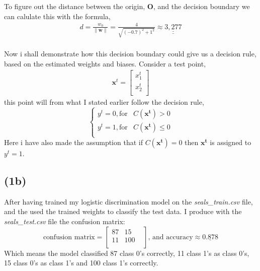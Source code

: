 \documentclass[12pt, letterpaper]{article}
\newcommand{\bs}{\boldsymbol}
\newcommand{\mbf}{\mathbf}
\begin{document}
      \newline
      To figure out the distance between the origin, $\bs{O}$, and the decision boundary we can calulate this with the formula,
      \begin{align*}
        d = \frac{w_0}{\|\bs{w}\|} = \frac{4}{\sqrt{(-0.7)^2 + 1^2}} \approx \underline{\underline{3,277}}
      \end{align*}\\
      Now i shall demonstrate how this decision boundary could give us a decision rule, based on the estimated weights and biases. Consider a test point,
      \begin{align*}
        \mbf{x}^t =
        \begin{bmatrix}
          x_1^t \\
          x_2^t \\
        \end{bmatrix}
      \end{align*}
      this point will from what I stated earlier follow the  decision rule,
      \[
        \begin{cases}
          y^t = 0, \text{for} & C(\mbf{x^t}) > 0\\
          y^t = 1, \text{for} & C(\mbf{x^t}) \leq 0\\
        \end{cases}
      \]
      Here i have also made the assumption that if  $C(\mbf{x^t}) = 0$ then $\mbf{x^t}$ is assigned to $y^t = 1$.

    \subsection*{(1b)}
      After having trained my logistic discrimination model on the \textit{seals\_train.csv} file, and the used the trained weights to classify the test data. I produce with the \textit{seals\_test.csv} file the confusion matrix:\\
      \[
        \text{confusion matrix} =
        \begin{bmatrix}
          87 & 15  & \\
          11 & 100 & \\
        \end{bmatrix}
        \text{, and accuracy} \approx \underline{0.878}
      \]
      Which means the model classified 87 class 0's correctly, 11 class 1's as class 0's, 15 class 0's as class 1's and 100 class 1's correctly.
    \newpage
\end{document}

